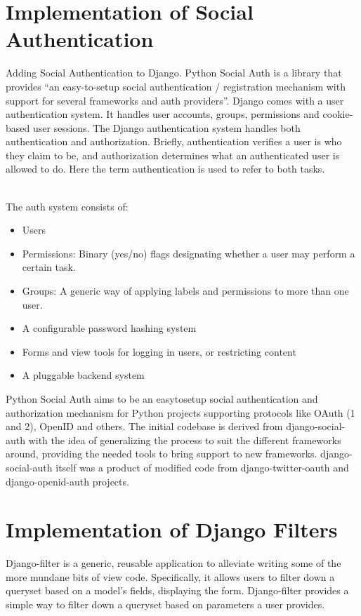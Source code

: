 \documentclass[12pt,a4paper]{report}
\begin{document}
\section{Implementation of Social Authentication}
\hspace{0.25cm}
\par
Adding Social Authentication to Django. Python Social Auth is a library that provides “an easy-to-setup social authentication / registration mechanism with support for several frameworks and auth providers”.
Django comes with a user authentication system. It handles user accounts, groups, permissions and cookie-based user sessions. The Django authentication system handles both authentication and authorization. Briefly, authentication verifies a user is who they claim to be, and authorization determines what an authenticated user is allowed to do. Here the term authentication is used to refer to both tasks.
\\
\\
\par
The auth system consists of:
\begin{itemize}
  \item Users
  \item Permissions: Binary (yes/no) flags designating whether a user may perform a certain task.
  \item Groups: A generic way of applying labels and permissions to more than one user.
  \item A configurable password hashing system
  \item Forms and view tools for logging in users, or restricting content
  \item A pluggable backend system
\end{itemize}
\par
Python Social Auth aims to be an easy\-to\-setup social authentication and authorization mechanism for Python projects supporting protocols like OAuth (1 and 2), OpenID and others.
The initial codebase is derived from django-social-auth with the idea of generalizing the process to suit the different frameworks around, providing the needed tools to bring support to new frameworks.
django-social-auth itself was a product of modified code from django-twitter-oauth and django-openid-auth projects.



\section{Implementation of Django Filters}
\hspace{0.25cm}
\par
Django-filter is a generic, reusable application to alleviate writing some of the more mundane bits of view code. Specifically, it allows users to filter down a queryset based on a model's fields, displaying the form. Django-filter provides a simple way to filter down a queryset based on parameters a user provides. 
\end{document}

